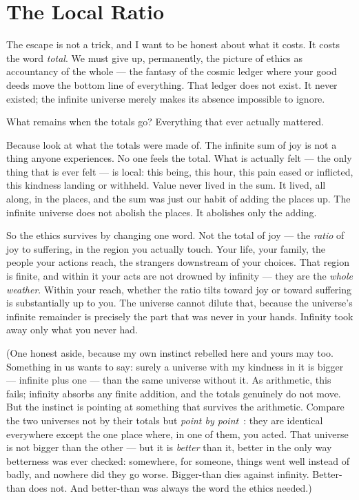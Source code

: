\documentclass[fontsize=11pt,paper=a4,pagesize=auto,parskip=half-]{scrbook}
\begin{document}
\section{The Local Ratio}

The escape is not a trick, and I want to be honest about what it costs. It costs the word \emph{total}. We must give up, permanently, the picture of ethics as accountancy of the whole --- the fantasy of the cosmic ledger where your good deeds move the bottom line of everything. That ledger does not exist. It never existed; the infinite universe merely makes its absence impossible to ignore.

What remains when the totals go? Everything that ever actually mattered.

Because look at what the totals were made of. The infinite sum of joy is not a thing anyone experiences. No one feels the total. What is actually felt --- the only thing that is ever felt --- is local: this being, this hour, this pain eased or inflicted, this kindness landing or withheld. Value never lived in the sum. It lived, all along, in the places, and the sum was just our habit of adding the places up. The infinite universe does not abolish the places. It abolishes only the adding.

So the ethics survives by changing one word. Not the total of joy --- the \emph{ratio} of joy to suffering, in the region you actually touch. Your life, your family, the people your actions reach, the strangers downstream of your choices. That region is finite, and within it your acts are not drowned by infinity --- they are the \emph{whole weather}. Within your reach, whether the ratio tilts toward joy or toward suffering is substantially up to you. The universe cannot dilute that, because the universe's infinite remainder is precisely the part that was never in your hands. Infinity took away only what you never had.

(One honest aside, because my own instinct rebelled here and yours may too. Something in us wants to say: surely a universe with my kindness in it is bigger --- infinite plus one --- than the same universe without it. As arithmetic, this fails; infinity absorbs any finite addition, and the totals genuinely do not move. But the instinct is pointing at something that survives the arithmetic. Compare the two universes not by their totals but \emph{point by point}~\cite{vallentynekagan1997}: they are identical everywhere except the one place where, in one of them, you acted. That universe is not bigger than the other --- but it is \emph{better} than it, better in the only way betterness was ever checked: somewhere, for someone, things went well instead of badly, and nowhere did they go worse. Bigger-than dies against infinity. Better-than does not. And better-than was always the word the ethics needed.)
\end{document}
